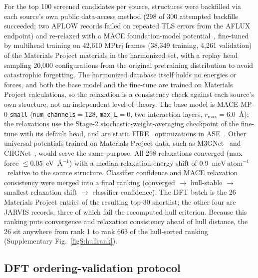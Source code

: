 \documentclass[aps,prb,preprint,superscriptaddress,longbibliography,nofootinbib]{revtex4-2}
\newcommand{\meVat}{\ensuremath{\mathrm{meV\,atom^{-1}}}}
\begin{document}
For the top 100 screened candidates per source, structures were backfilled via each source's own public
data-access method (298 of 300 attempted backfills succeeded; two AFLOW records failed on repeated TLS errors
from the AFLUX endpoint) and re-relaxed with a MACE foundation-model potential~\cite{batatia2022,batatia2023},
fine-tuned by multihead training on 42{,}610 MPtrj frames (38{,}349 training, 4{,}261 validation) of the
Materials Project materials in the harmonized set, with a replay head sampling 20{,}000 configurations from the
original pretraining distribution to avoid catastrophic forgetting. The harmonized database itself holds no
energies or forces, and both the base model and the fine-tune are trained on Materials Project calculations, so
the relaxation is a consistency check against each source's own structure, not an independent level of
theory. The base model is MACE-MP-0 \texttt{small}
(\texttt{num\_channels}$=128$, \texttt{max\_L}$=0$, two interaction layers, $r_\mathrm{max}=6.0$~\AA); the
relaxations use the Stage-2 stochastic-weight-averaging checkpoint of the fine-tune with its default head, and are static
FIRE~\cite{bitzek2006} optimizations in ASE~\cite{larsen2017}. Other universal potentials trained on Materials
Project data, such as M3GNet~\cite{chen2022} and CHGNet~\cite{deng2023}, would serve the same purpose. All 298
relaxations converged (max force $\le 0.05$~eV~\AA$^{-1}$) with a median relaxation-energy shift of
0.9~\meVat\ relative to the source structure. Classifier confidence and MACE relaxation consistency
were merged into a final ranking (converged $\to$ hull-stable $\to$ smallest relaxation shift $\to$ classifier
confidence). The DFT batch is the 26 Materials Project entries of the resulting top-30 shortlist; the other four
are JARVIS records, three of which fail the recomputed hull criterion. Because this ranking puts convergence and
relaxation consistency ahead of hull distance, the 26 sit anywhere from rank 1 to rank 663 of the hull-sorted
ranking (Supplementary Fig.~\ref{figS:hullrank}).

\subsection*{DFT ordering-validation protocol}
\end{document}
